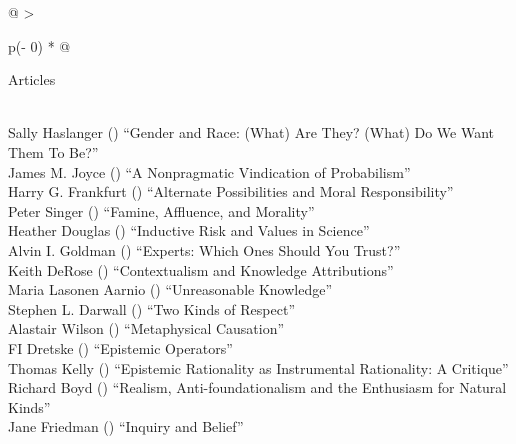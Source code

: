 \documentclass[
  10pt,
  letterpaper,
  DIV=11,
  numbers=noendperiod,
  twoside]{scrartcl}
\begin{document}
\begin{longtable}[]{@{}
  >{\raggedright\arraybackslash}p{(\columnwidth - 0\tabcolsep) * }@{}}

\caption{\label{tbl-late-bloomers}Most cited articles since 2020 not on
any of the earlier lists}

\tabularnewline

\toprule\noalign{}
\begin{minipage}[b]{\linewidth}\raggedright
Articles
\end{minipage} \\
\midrule\noalign{}
\endhead
\bottomrule\noalign{}
\endlastfoot
Sally Haslanger
()
``Gender and Race: (What) Are They? (What) Do We Want Them To Be?'' \\
James M. Joyce
()
``A Nonpragmatic Vindication of Probabilism'' \\
Harry G. Frankfurt
()
``Alternate Possibilities and Moral Responsibility'' \\
Peter Singer
()
``Famine, Affluence, and Morality'' \\
Heather Douglas
()
``Inductive Risk and Values in Science'' \\
Alvin I. Goldman
()
``Experts: Which Ones Should You Trust?'' \\
Keith DeRose
()
``Contextualism and Knowledge Attributions'' \\
Maria Lasonen Aarnio
()
``Unreasonable Knowledge'' \\
Stephen L. Darwall
()
``Two Kinds of Respect'' \\
Alastair Wilson
()
``Metaphysical Causation'' \\
FI Dretske
()
``Epistemic Operators'' \\
Thomas Kelly
()
``Epistemic Rationality as Instrumental Rationality: A Critique'' \\
Richard Boyd
()
``Realism, Anti-foundationalism and the Enthusiasm for Natural
Kinds'' \\
Jane Friedman
()
``Inquiry and Belief'' \\

\end{longtable}
\end{document}
